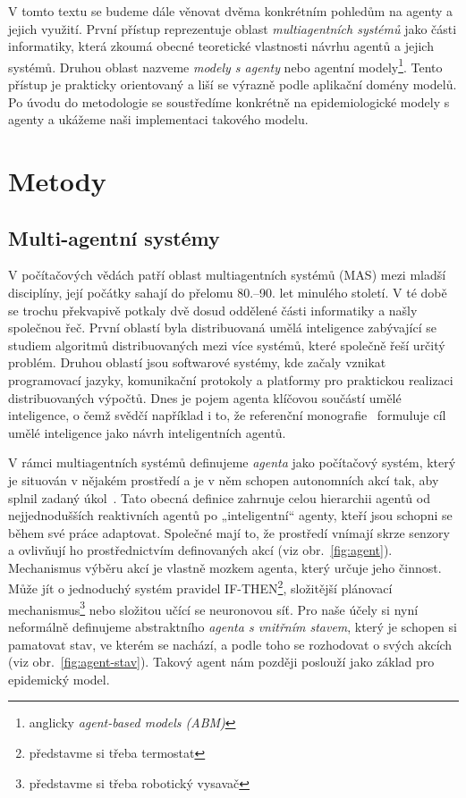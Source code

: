 V tomto textu se budeme dále věnovat dvěma konkrétním pohledům na agenty a jejich využití. První přístup reprezentuje oblast \emph{multiagentních systémů} jako části informatiky, která zkoumá obecné teoretické vlastnosti návrhu agentů a jejich systémů. Druhou oblast nazveme \emph{modely s agenty} nebo agentní modely\footnote{anglicky \emph{agent-based models (ABM)}}. Tento přístup je prakticky orientovaný a liší se výrazně podle aplikační domény modelů. Po úvodu do metodologie se soustředíme konkrétně na epidemiologické modely s agenty a ukážeme naši implementaci takového modelu.

\section*{Metody} 

\subsection*{Multi-agentní systémy}

V počítačových vědách patří oblast multiagentních systémů (MAS) mezi mladší disciplíny, její počátky sahají do přelomu 80.--90. let minulého století. V té době se trochu překvapivě potkaly dvě dosud oddělené části informatiky a našly společnou řeč. První oblastí byla distribuovaná umělá inteligence zabývající se studiem algoritmů distribuovaných mezi více systémů, které společně řeší určitý problém. Druhou oblastí jsou softwarové systémy, kde začaly vznikat programovací jazyky, komunikační protokoly a platformy pro praktickou realizaci distribuovaných výpočtů. Dnes je pojem agenta klíčovou součástí umělé inteligence, o čemž svědčí například i to, že referenční monografie~\cite{AIMA20} formuluje cíl umělé inteligence jako návrh inteligentních agentů. 

V rámci multiagentních systémů definujeme \emph{agenta} jako počítačový systém, který je situován v nějakém prostředí a je v něm schopen autonomních akcí tak, aby splnil zadaný úkol~\cite{Wooldridge09}. Tato obecná definice zahrnuje celou hierarchii agentů od nejjednodušších reaktivních agentů po „inteligentní“ agenty, kteří jsou schopni se během své práce adaptovat. Společné mají to, že prostředí vnímají skrze senzory a ovlivňují ho prostřednictvím definovaných akcí (viz obr.~\ref{fig:agent}). Mechanismus výběru akcí je vlastně mozkem agenta, který určuje jeho činnost. Může jít o jednoduchý systém pravidel IF-THEN\footnote{představme si třeba termostat}, složitější plánovací mechanismus\footnote{představme si třeba robotický vysavač} nebo složitou učící se neuronovou síť. Pro naše účely si nyní neformálně definujeme abstraktního \emph{agenta s vnitřním stavem}, který je schopen si pamatovat stav, ve kterém se nachází, a podle toho se rozhodovat o svých akcích (viz obr.~\ref{fig:agent-stav}). Takový agent nám později poslouží jako základ pro epidemický model.  

